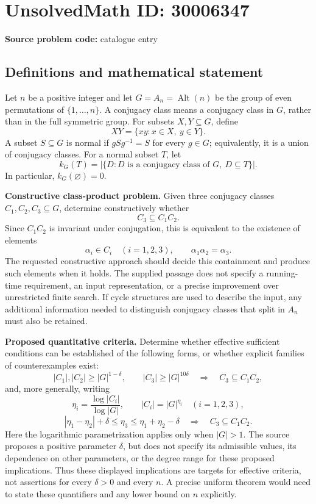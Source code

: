 \documentclass[11pt]{article}
\begin{document}
\section*{UnsolvedMath ID: 30006347}
\textbf{Source problem code:} catalogue entry
\subsection{Definitions and mathematical statement}
Let \(n\) be a positive integer and let \(G=A_n=\operatorname{Alt}(n)\) be the group of even permutations of \(\{1,\ldots,n\}\). A conjugacy class means a conjugacy class in \(G\), rather than in the full symmetric group. For subsets \(X,Y\subseteq G\), define
\[
XY=\{xy:x\in X,\ y\in Y\}.
\]
A subset \(S\subseteq G\) is normal if \(gSg^{-1}=S\) for every \(g\in G\); equivalently, it is a union of conjugacy classes. For a normal subset \(T\), let
\[
k_G(T)=\bigl|\{D:D\text{ is a conjugacy class of }G,\ D\subseteq T\}\bigr|.
\]
In particular, \(k_G(\varnothing)=0\).

\textbf{Constructive class-product problem.} Given three conjugacy classes \(C_1,C_2,C_3\subseteq G\), determine constructively whether
\[
C_3\subseteq C_1C_2.
\]
Since \(C_1C_2\) is invariant under conjugation, this is equivalent to the existence of elements
\[
\alpha_i\in C_i\quad(i=1,2,3),\qquad \alpha_1\alpha_2=\alpha_3.
\]
The requested constructive approach should decide this containment and produce such elements when it holds. The supplied passage does not specify a running-time requirement, an input representation, or a precise improvement over unrestricted finite search. If cycle structures are used to describe the input, any additional information needed to distinguish conjugacy classes that split in \(A_n\) must also be retained.

\textbf{Proposed quantitative criteria.} Determine whether effective sufficient conditions can be established of the following forms, or whether explicit families of counterexamples exist:
\[
|C_1|,|C_2|\geq |G|^{1-\delta},\qquad
|C_3|\geq |G|^{10\delta}
\quad\Longrightarrow\quad C_3\subseteq C_1C_2,
\]
and, more generally, writing
\[
\eta_i=\frac{\log |C_i|}{\log |G|},\qquad |C_i|=|G|^{\eta_i}\quad(i=1,2,3),
\]
\[
|\eta_1-\eta_2|+\delta\leq\eta_3
\leq\eta_1+\eta_2-\delta
\quad\Longrightarrow\quad C_3\subseteq C_1C_2.
\]
Here the logarithmic parametrization applies only when \(|G|>1\). The source proposes a positive parameter \(\delta\), but does not specify its admissible values, its dependence on other parameters, or the degree range for these proposed implications. Thus these displayed implications are targets for effective criteria, not assertions for every \(\delta>0\) and every \(n\). A precise uniform theorem would need to state these quantifiers and any lower bound on \(n\) explicitly.
\end{document}

